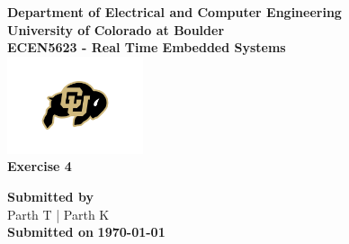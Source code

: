 \begin{titlepage}
\center %

\textbf{\large Department of Electrical and Computer Engineering}\\[0.5cm]
\textbf{\Large University of Colorado at Boulder}\\[1cm]
\textbf{\large ECEN5623 - Real Time Embedded Systems }\\[2cm]
\includegraphics[width=0.3\textwidth]{figures/cu}\\[2cm]

	
\textbf{\Huge Exercise 4 }\\[0.2cm]





\vfill

\textbf{\large Submitted by}\\[0.5cm]

{\large Parth T | Parth K}\\[0.5cm]	


\textbf{\large Submitted on}
\textbf{\Large \today} %


\vfill %

\end{titlepage}